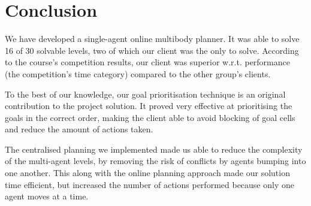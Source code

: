 \section{Conclusion}
\label{sec:conclusion}

We have developed a single-agent online multibody planner.
It was able to solve 16 of 30 solvable levels, two of which our client was the only to solve.
According to the course's competition results, our client was superior w.r.t. performance (the competition's time category) compared to the other group's clients.

To the best of our knowledge, our goal prioritisation technique is an original contribution to the project solution. 
It proved very effective at prioritising the goals in the correct order, making the client able to avoid blocking of goal cells and reduce the amount of actions taken.

The centralised planning we implemented made us able to reduce the complexity of the multi-agent levels, by removing the risk of conflicts by agents bumping into one another.
This along with the online planning approach made our solution time efficient, but increased the number of actions performed because only one agent moves at a time.



